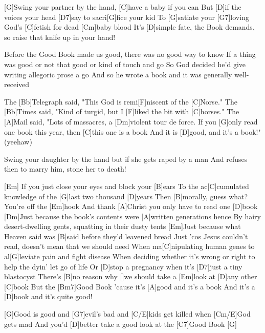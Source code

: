 \begin{guitar}
	[G]Swing your partner by the hand, [C]have a baby if you can
	But [D]if the voices your head [D7]say to sacri[G]fice your kid
	To [G]satiate your [G7]loving God's [C]fetish for dead [Cm]baby blood
	It's [D]simple fate, the Book demands, so raise that knife up in your hand!
	
	Before the Good Book made us good, there was no good way to know
	If a thing was good or not that good or kind of touch and go
	So God decided he'd give writing allegoric prose a go
	And so he wrote a book and it was generally well-received
	
	The [Bb]Telegraph said, "This God is remi[F]niscent of the [C]Norse."
	The [Bb]Times said, "Kind of turgid, but I [F]liked the bit with [C]horses."
	The [A]Mail said, "Lots of massacres, a [Dm]violent tour de force.
	If you [G]only read one book this year, then [C]this one is a book
	And it is [D]good, and it's a book!" (yeehaw)
	
	Swing your daughter by the hand but if she gets raped by a man
	And refuses then to marry him, stone her to death!
	
	[Em] If you just close your eyes and block your [B]ears
	To the ac[C]cumulated knowledge of the [G]last two thousand [D]years
	Then [B]morally, guess what? You're off the [Em]hook
	And thank [A]Christ you only have to read one [D]book
	\pagebreak
	[Dm]Just because the book's contents were [A]written generations hence
	By hairy desert-dwelling gents, squatting in their dusty tents
	[Em]Just because what Heaven said was [B]said before they'd leavened bread
	Just 'cos Jesus couldn't read, doesn't mean that we should need
	When ma[C]nipulating human genes to al[G]leviate pain and fight disease
	When deciding whether it's wrong or right to help the dyin' let go of life
	Or [D]stop a pregnancy when it's [D7]just a tiny blastocyst
	There's [B]no reason why []we should take a [Em]look at [D]any other [C]book 
	But the [Bm7]Good Book 'cause it's [A]good and it's a book 
	And it's a [D]book and it's quite good!
	
	[G]Good is good and [G7]evil's bad and [C/E]kids get killed when [Cm/E]God gets mad
	And you'd [D]better take a good look at the [C7]Good Book [G]{}
\end{guitar}